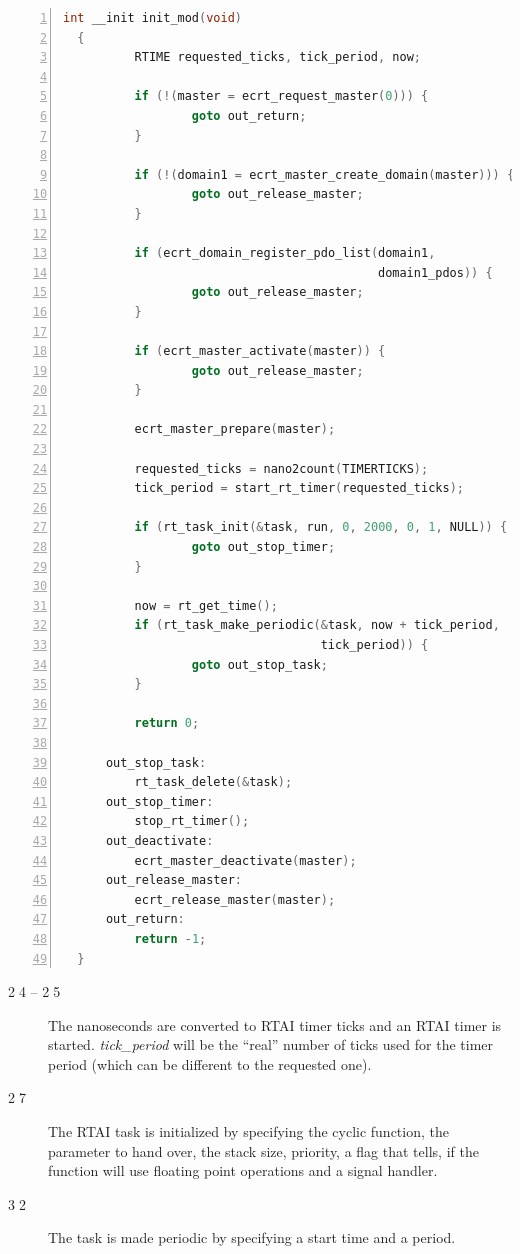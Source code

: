 \documentclass[a4paper,12pt,BCOR6mm,bibtotoc,idxtotoc]{scrbook}
\begin{document}
\begin{lstlisting}[language=C,numbers=left,caption={RTAI module init
    function},label={lst:rtaiinit}]
  int __init init_mod(void)
  {
          RTIME requested_ticks, tick_period, now;

          if (!(master = ecrt_request_master(0))) {
                  goto out_return;
          }

          if (!(domain1 = ecrt_master_create_domain(master))) {
                  goto out_release_master;
          }

          if (ecrt_domain_register_pdo_list(domain1,
                                            domain1_pdos)) {
                  goto out_release_master;
          }

          if (ecrt_master_activate(master)) {
                  goto out_release_master;
          }

          ecrt_master_prepare(master);

          requested_ticks = nano2count(TIMERTICKS);
          tick_period = start_rt_timer(requested_ticks);

          if (rt_task_init(&task, run, 0, 2000, 0, 1, NULL)) {
                  goto out_stop_timer;
          }

          now = rt_get_time();
          if (rt_task_make_periodic(&task, now + tick_period,
                                    tick_period)) {
                  goto out_stop_task;
          }

          return 0;

      out_stop_task:
          rt_task_delete(&task);
      out_stop_timer:
          stop_rt_timer();
      out_deactivate:
          ecrt_master_deactivate(master);
      out_release_master:
          ecrt_release_master(master);
      out_return:
          return -1;
  }
\end{lstlisting}

\begin{description}
\item[\normalfont\textcircled{\tiny 24} -- \textcircled{\tiny 25}] The
  nanoseconds are converted to RTAI timer ticks and an RTAI timer is
  started.  \textit{tick\_period} will be the ``real'' number of ticks
  used for the timer period (which can be different to the requested
  one).
\item[\normalfont\textcircled{\tiny 27}] The RTAI task is initialized
  by specifying the cyclic function, the parameter to hand over, the
  stack size, priority, a flag that tells, if the function will use
  floating point operations and a signal handler.
\item[\normalfont\textcircled{\tiny 32}] The task is made periodic by
  specifying a start time and a period.
\end{description}
\end{document}
